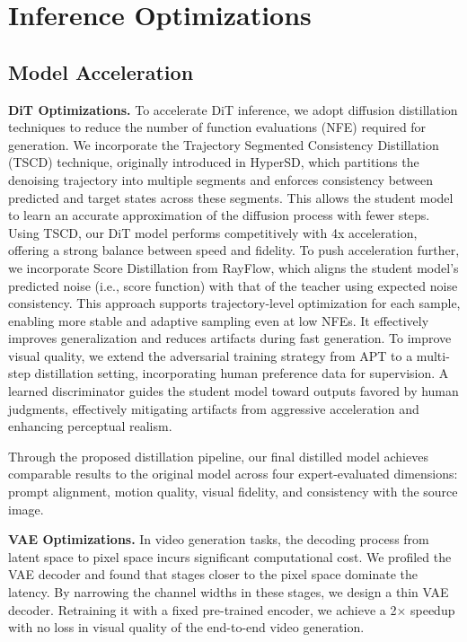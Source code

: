 \section{Inference Optimizations}

\subsection{Model Acceleration}
\textbf{DiT Optimizations.} To accelerate DiT inference, we adopt diffusion distillation techniques to reduce the number of function evaluations (NFE) required for generation. We incorporate the Trajectory Segmented Consistency Distillation (TSCD) technique, originally introduced in HyperSD\cite{ren2025hyper}, which partitions the denoising trajectory into multiple segments and enforces consistency between predicted and target states across these segments. This allows the student model to learn an accurate approximation of the diffusion process with fewer steps. Using TSCD, our DiT model performs competitively with 4x acceleration, offering a strong balance between speed and fidelity. To push acceleration further, we incorporate Score Distillation from  RayFlow\cite{shao2025rayflow}, which aligns the student model’s predicted noise (i.e., score function) with that of the teacher using expected noise consistency. This approach supports trajectory-level optimization for each sample, enabling more stable and adaptive sampling even at low NFEs. It effectively improves generalization and reduces artifacts during fast generation. To improve visual quality, we extend the adversarial training strategy from APT\cite{lin2025diffusion} to a multi-step distillation setting, incorporating human preference data for supervision. A learned discriminator guides the student model toward outputs favored by human judgments, effectively mitigating artifacts from aggressive acceleration and enhancing perceptual realism.

Through the proposed distillation pipeline, our final distilled model achieves comparable results to the original model across four expert-evaluated dimensions: prompt alignment, motion quality, visual fidelity, and consistency with the source image.

\textbf{VAE Optimizations.} In video generation tasks, the decoding process from latent space to pixel space incurs significant computational cost. We profiled the VAE decoder and found that stages closer to the pixel space dominate the latency. By narrowing the channel widths in these stages, we design a thin VAE decoder. Retraining it with a fixed pre-trained encoder, we achieve a 2× speedup with no loss in visual quality of the end-to-end video generation.

